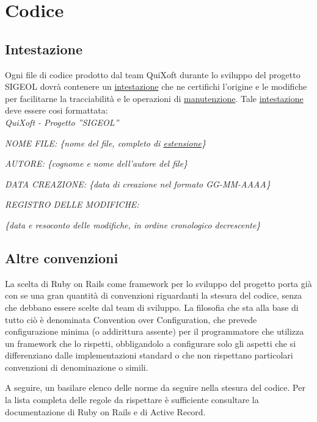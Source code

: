 \documentclass[11pt,a4paper]{article}
\begin{document}
\section{Codice}
\subsection{Intestazione}
Ogni file di codice prodotto dal team QuiXoft durante lo sviluppo del progetto SIGEOL dovrà contenere un \underline{intestazione} che ne certifichi l'origine e le modifiche per facilitarne la tracciabilità e le operazioni di \underline{manutenzione}.
Tale \underline{intestazione} deve essere cosi formattata: \\

\textit{QuiXoft - Progetto ''SIGEOL''}

\textit{NOME FILE: \{nome del file, completo di \underline{estensione}\}}

\textit{AUTORE: \{cognome e nome dell'autore del file\}}

\textit{DATA CREAZIONE: \{data di creazione nel formato GG-MM-AAAA\}}

\textit{REGISTRO DELLE MODIFICHE:}

\textit{\{data e resoconto delle modifiche, in ordine cronologico decrescente\}}
\subsection{Altre convenzioni}
La scelta di Ruby on Rails come framework per lo sviluppo del progetto porta già con se una gran quantità di convenzioni riguardanti la stesura del codice, senza che debbano essere scelte dal team di sviluppo.
La filosofia che sta alla base di tutto ciò è denominata Convention over Configuration, che prevede configurazione minima (o addirittura assente) per il programmatore che utilizza un framework che lo rispetti, obbligandolo a configurare solo gli aspetti che si differenziano dalle implementazioni standard o che non rispettano particolari convenzioni di denominazione o simili.

A seguire, un basilare elenco delle norme da seguire nella stesura del codice. Per la lista completa delle regole da rispettare è sufficiente consultare la documentazione di Ruby on Rails e di Active Record.
\end{document}
